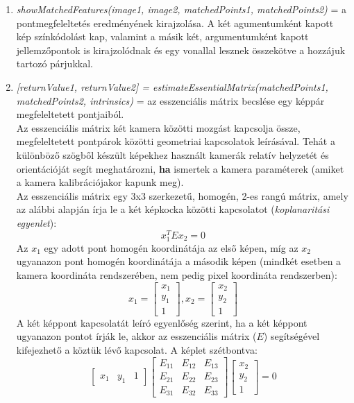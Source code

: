 \documentclass[12pt]{report}
\begin{document}
\begin{enumerate}
                    \item \textit{showMatchedFeatures(image1, image2, matchedPoints1, matchedPoints2)} = a pontmegfeleltetés eredményének kirajzolása. A két agumentumként kapott kép színkódolást kap, valamint a másik két, argumentumként kapott jellemzőpontok is kirajzolódnak és egy vonallal lesznek összekötve a hozzájuk tartozó párjukkal.
                    \item \textit{[returnValue1, returnValue2] = estimateEssentialMatrix(matchedPoints1, matchedPoints2, intrinsics)} = az esszenciális mátrix becslése egy képpár megfeleltetett pontjaiból.\\
                    Az esszenciális mátrix két kamera közötti mozgást kapcsolja össze, megfeleltetett pontpárok közötti geometriai kapcsolatok leírásával. Tehát a különböző szögből készült képekhez használt kamerák relatív helyzetét és orientációját segít meghatározni, \textbf{ha} ismertek a kamera paraméterek (amiket a kamera kalibrációjakor kapunk meg).\\
                    Az esszenciális mátrix egy 3x3 szerkezetű, homogén, 2-es rangú mátrix, amely az alábbi alapján írja le a két képkocka közötti kapcsolatot (\textit{koplanaritási egyenlet}):
                    \[x_1^TEx_2 = 0\]
                    Az $x_1$ egy adott pont homogén koordinátája az első képen, míg az $x_2$ ugyanazon pont homogén koordinátája a második képen (mindkét esetben a kamera koordináta rendszerében, nem pedig pixel koordináta rendszerben):
                    \[x_1 = \begin{bmatrix}x_1\\y_1\\1\end{bmatrix}, x_2 = \begin{bmatrix}x_2\\y_2\\1\end{bmatrix}\]
                    A két képpont kapcsolatát leíró egyenlőség szerint, ha a két képpont ugyanazon pontot írják le, akkor az esszenciális mátrix ($E$) segítségével kifejezhető a köztük lévő kapcsolat. A képlet szétbontva:\\
                    \[\begin{bmatrix}x_1&y_1&1\end{bmatrix}\begin{bmatrix}E_{11}&E_{12}&E_{13}\\E_{21}&E_{22}&E_{23}\\E_{31}&E_{32}&E_{33}\end{bmatrix}\begin{bmatrix}x_2\\y_2\\1\end{bmatrix} = 0\]

\end{enumerate}
\end{document}

